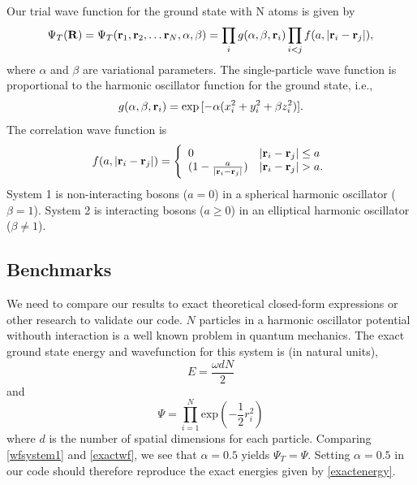 \documentclass[english, a4paper]{article}
\begin{document}
 Our trial wave function for the ground state with N atoms is given by
  \begin{equation}
 \Psi_T({\bf R})=\Psi_T({\bf r}_1, {\bf r}_2, \dots {\bf r}_N,\alpha,\beta)=\prod_i g(\alpha,\beta,{\bf r}_i)\prod_{i<j}f(a,|{\bf r}_i-{\bf r}_j|),
 \label{trialwf}
 \end{equation}
 where $\alpha$ and $\beta$ are variational parameters.
 The single-particle wave function is proportional to the harmonic
 oscillator function for the ground state, i.e.,
 \begin{equation}
    g(\alpha,\beta,{\bf r}_i)= \exp{[-\alpha(x_i^2+y_i^2+\beta z_i^2)]}.
 \end{equation}
 The correlation wave
 function is
 \begin{equation}
    f(a,|{\bf r}_i-{\bf r}_j|)=\Bigg\{
 \begin{array}{ll}
	 0 & {|{\bf r}_i-{\bf r}_j|} \leq {a}\\
	 (1-\frac{a}{|{\bf r}_i-{\bf r}_j|}) & {|{\bf r}_i-{\bf r}_j|} > {a}.
 \end{array}
 \end{equation}
 System 1 is non-interacting bosons ($a=0$) in a spherical harmonic oscillator ($\beta=1$). 
 System 2 is interacting bosons ($a \geq 0$) in an elliptical harmonic oscillator ($\beta \neq 1$).
 


\subsection{Benchmarks}
We need to compare our results to exact theoretical closed-form expressions or other research to validate our code. 
$N$ particles in a harmonic oscillator potential withouth interaction
is a well known problem in quantum mechanics. 
The exact ground state energy and wavefunction for this system is (in natural units),
\begin{equation}
 E = \frac{\omega dN}{2}
 \label{exactenergy}
\end{equation}
and
\begin{equation}
 \Psi = \prod_{i=1}^N \textrm{exp}\left(-\frac{1}{2}r_i^2 \right)
 \label{exactwf}
\end{equation}
where $d$ is the number of spatial dimensions for each particle.
Comparing \eqref{wfsystem1} and \eqref{exactwf}, we see that $\alpha = 0.5$ 
yields $\Psi_T = \Psi$. Setting $\alpha = 0.5$ in our code should therefore reproduce the exact energies
given by \eqref{exactenergy}. \\
\end{document}
